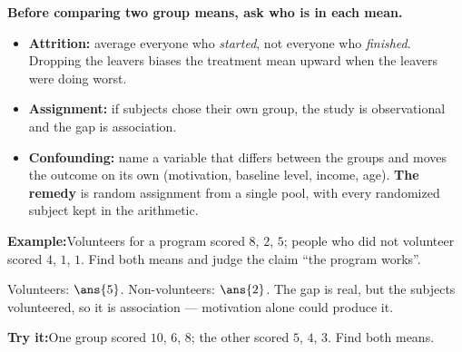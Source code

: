 \documentclass[12pt]{article}
\begin{document}
\begin{formulabox}
\textbf{Before comparing two group means, ask who is in each mean.}
\begin{itemize}[leftmargin=0.8cm, itemsep=1pt, topsep=2pt]
  \item \textbf{Attrition:} average everyone who \emph{started}, not everyone who
        \emph{finished}. Dropping the leavers biases the treatment mean upward
        when the leavers were doing worst.
  \item \textbf{Assignment:} if subjects chose their own group, the study is
        observational and the gap is association.
  \item \textbf{Confounding:} name a variable that differs between the groups and
        moves the outcome on its own (motivation, baseline level, income, age).
        \textbf{The remedy} is random assignment from a single pool, with every
        randomized subject kept in the arithmetic.
\end{itemize}
\end{formulabox}

\begin{examplebox}
\textbf{Example:}\quad Volunteers for a program scored $8$, $2$, $5$; people who
did not volunteer scored $4$, $1$, $1$. Find both means and judge the claim ``the
program works''.



Volunteers: $\ans{5}$. Non-volunteers: $\ans{2}$. The gap is real, but the
subjects volunteered, so it is association --- motivation alone could produce it.
\end{examplebox}

\begin{tryitbox}
\textbf{Try it:}\quad One group scored $10$, $6$, $8$; the other scored $5$, $4$,
$3$. Find both means.

\end{tryitbox}

\end{document}
